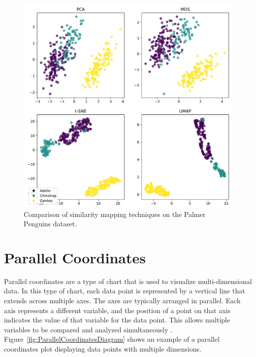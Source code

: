 \begin{figure}[tp]
\centering
\includegraphics[frame,keepaspectratio,width=\linewidth,height=\halfh]
{diagrams/penguins.pdf}

\caption[Similarity Mapping on Palmer Penguins dataset]
{
  Comparison of similarity mapping techniques on the Palmer Penguins
  dataset.
}
\label{fig:PenguinDataset}
\end{figure}


\section{Parallel Coordinates}

Parallel coordinates are a type of chart that is used to visualize
multi-dimensional data. In this type of chart, each data point is
represented by a vertical line that extends across multiple axes. The axes
are typically arranged in parallel. Each axis represents a different
variable, and the position of a point on that axis indicates the value of
that variable for the data point. This allows multiple variables to be
compared and analyzed simultaneously \parencite{inselberg1990parallel}.
Figure~\ref{fig:ParallelCoordinatesDiagram} shows an example of a parallel
coordinates plot displaying data points with multiple dimensions.

